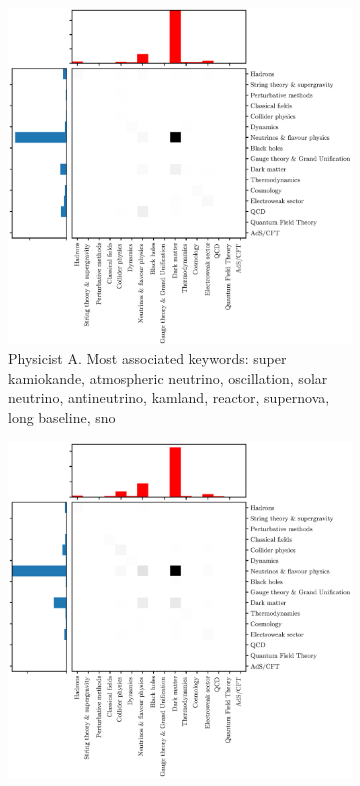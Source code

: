 \documentclass{article}
\begin{document}
\begin{figure}[h]
\begin{subfigure}{.45\textwidth}
    \includegraphics[width=1.15\textwidth]{plots/trajectory_example_S.Ando.1.eps}
    \caption{Physicist A. Most associated keywords: super kamiokande, atmospheric neutrino, oscillation, solar neutrino, antineutrino, kamland, reactor, supernova, long baseline, sno}
    \label{fig:S.Ando.1}
\end{subfigure}\hfill%
\begin{subfigure}{0.45\textwidth}
    \includegraphics[width=1.15\textwidth]{plots/trajectory_example_J.F.Beacom.1.eps}

\end{subfigure}
\end{figure}
\end{document}
